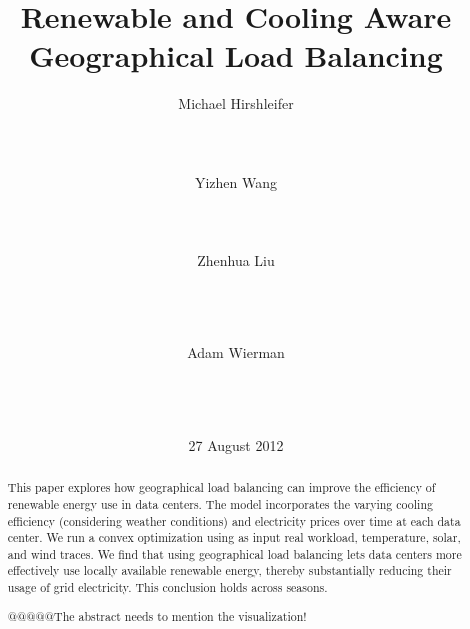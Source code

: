 \documentclass{acm_proc_article-sp}
\begin{document}
\title{Renewable and Cooling Aware Geographical Load Balancing}
\author{
%
%
\alignauthor
Michael Hirshleifer\\
       \\
       \\
       \\
\alignauthor
Yizhen Wang\\
       \\
       \\
       \\
\alignauthor
Zhenhua Liu\\
       \\
       \\
       \\
\and
\alignauthor
Adam Wierman\\
       \\
       \\
       \\
}

\date{27 August 2012}

\maketitle
\begin{abstract}
This paper explores how geographical load balancing can improve the efficiency of renewable energy use in data centers.
The model incorporates the varying cooling efficiency (considering weather conditions) and electricity prices over time at each data center.
We run a convex optimization using as input real workload, temperature, solar, and wind traces.
We find that using geographical load balancing lets data centers more effectively use locally available renewable energy, thereby substantially reducing their usage of grid electricity. This conclusion holds across seasons.

@@@@@The abstract needs to mention the visualization!

\end{abstract}
\end{document}
